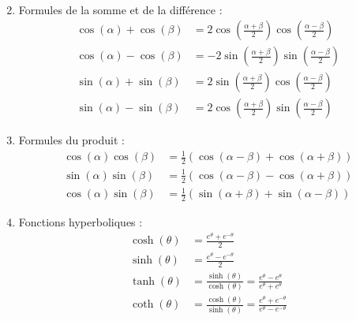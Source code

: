 \begin{enumerate}
\begin{align*}
    \end{align*}
    \item Formules de la somme et de la différence :
    \begin{align*}
        \cos(\alpha) + \cos(\beta) &= 2 \cos\left(\frac{\alpha + \beta}{2}\right) \cos\left(\frac{\alpha - \beta}{2}\right) \\
        \cos(\alpha) - \cos(\beta) &= -2 \sin\left(\frac{\alpha + \beta}{2}\right) \sin\left(\frac{\alpha - \beta}{2}\right) \\
        \sin(\alpha) + \sin(\beta) &= 2 \sin\left(\frac{\alpha + \beta}{2}\right) \cos\left(\frac{\alpha - \beta}{2}\right) \\
        \sin(\alpha) - \sin(\beta) &= 2 \cos\left(\frac{\alpha + \beta}{2}\right) \sin\left(\frac{\alpha - \beta}{2}\right)
    \end{align*}
    \item Formules du produit :
    \begin{align*}
        \cos(\alpha) \cos(\beta) &= \frac{1}{2} \left( \cos(\alpha - \beta) + \cos(\alpha + \beta) \right) \\
        \sin(\alpha) \sin(\beta) &= \frac{1}{2} \left( \cos(\alpha - \beta) - \cos(\alpha + \beta) \right) \\
        \cos(\alpha) \sin(\beta) &= \frac{1}{2} \left( \sin(\alpha + \beta) + \sin(\alpha - \beta) \right)
    \end{align*}
    \item Fonctions hyperboliques :
    \begin{align*}
        \cosh(\theta) &= \frac{e^\theta + e^{-\theta}}{2} \\
        \sinh(\theta) &= \frac{e^\theta - e^{-\theta}}{2} \\
        \tanh(\theta) &= \frac{\sinh(\theta)}{\cosh(\theta)} = \frac{e^\theta - e^{\theta}}{e^\theta + e^{\theta}} \\
        \coth(\theta) &= \frac{\cosh(\theta)}{\sinh(\theta)} = \frac{e^\theta + e^{-\theta}}{e^\theta - e^{-\theta}}
    \end{align*}
\end{enumerate}